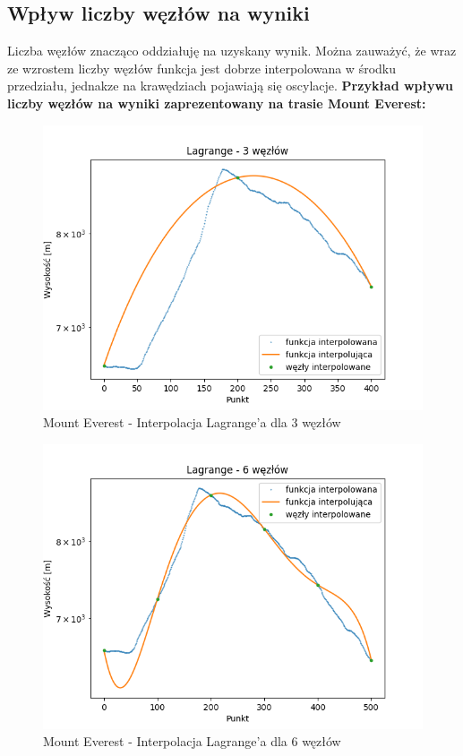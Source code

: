 \documentclass[12pt]{extarticle}
\begin{document}
\subsection*{Wpływ liczby węzłów na wyniki}
Liczba węzłów znacząco oddziałuję na uzyskany wynik.    Można zauważyć, że wraz ze wzrostem liczby węzłów funkcja jest dobrze interpolowana w środku przedziału, jednakze na krawędziach pojawiają się oscylacje.
\newpage
\textbf{Przykład wpływu liczby węzłów na wyniki zaprezentowany na trasie Mount Everest:}
\begin{figure}[H]
    \centering
    \includegraphics[scale=0.8]{interpolation_MountEverest_Lagrange_3.png}
    \caption{Mount Everest - Interpolacja Lagrange'a dla 3 węzłów}
\end{figure}
\begin{figure}[H]
    \centering
    \includegraphics[scale=0.8]{interpolation_MountEverest_Lagrange_6.png}
    \caption{Mount Everest - Interpolacja Lagrange'a dla 6 węzłów}
\end{figure}
\end{document}

